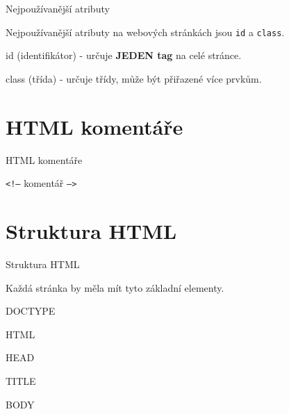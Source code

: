 \documentclass[aspectratio=1610]{beamer}
\begin{document}
\begin{frame}{Nejpoužívanější atributy}
    \begin{cardTiny}
        \begin{flushleft}
            Nejpoužívanější atributy na webových stránkách jsou \texttt{id} a \texttt{class}.

            \vspace{3ex}
            id (identifikátor) - určuje \textbf{JEDEN tag} na celé stránce.

            \vspace{2ex}
            class (třída) - určuje třídy, může být přiřazené více prvkům. 
        \end{flushleft}
    \end{cardTiny}
\end{frame}



\section{HTML komentáře}
\begin{frame}{HTML komentáře}
    \begin{cardTiny}
        \begin{center}
        \texttt{<!--} komentář \texttt{-->}
        \end{center}
    \end{cardTiny}
\end{frame}



\section{Struktura HTML}
\begin{frame}{Struktura HTML}
    \begin{cardTiny}
        \begin{flushleft}
            Každá stránka by měla mít tyto základní elementy.
        \end{flushleft}
    \end{cardTiny}
    \begin{cardTiny}
        \begin{flushleft}
            DOCTYPE

            HTML

            HEAD

            TITLE

            BODY
        \end{flushleft}
    \end{cardTiny}
\end{frame}
\end{document}

